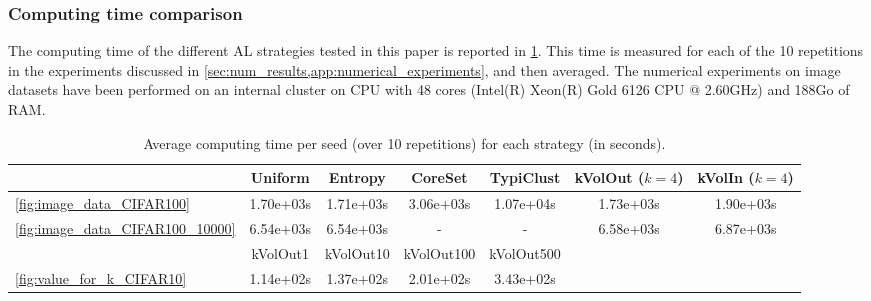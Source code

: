 \documentclass[twoside]{article}
\DeclareMathOperator{\kvol}{kVol}
\theoremstyle{definition}
\theoremstyle{remark}
\newcommand{\Dpool}{\mathcal{D}^{\mathrm{pool}}}
\begin{document}
\subsubsection{Computing time comparison}
\label{app:computing_time_comparison}

The computing time of the different AL strategies tested in this paper is reported in \cref{tab:computing_time_comparison}.
This time is measured for each of the 10 repetitions in the experiments discussed in \cref{sec:num_results,app:numerical_experiments}, and then averaged.
The numerical experiments on image datasets have been performed on an internal cluster on CPU with 48 cores (Intel(R) Xeon(R) Gold 6126 CPU @ 2.60GHz) and 188Go of RAM.

\begin{table}[ht]
    \centering
    \caption{Average computing time per seed (over 10 repetitions) for each strategy (in seconds).}
    \label{tab:computing_time_comparison}
    \begin{tabular}{lcccccc}
    \toprule
          & Uniform & Entropy & CoreSet & TypiClust & kVolOut ($k=4$) & kVolIn ($k=4$) \\
    \midrule
         \cref{fig:image_data_CIFAR100} & 1.70e+03s & 1.71e+03s & 3.06e+03s & 1.07e+04s & 1.73e+03s & 1.90e+03s \\
         \cref{fig:image_data_CIFAR100_10000} & 6.54e+03s & 6.54e+03s & - & - & 6.58e+03s & 6.87e+03s \\
    \bottomrule
    \toprule
        & kVolOut1 & kVolOut10 & kVolOut100 & kVolOut500 & & \\
    \midrule
        \cref{fig:value_for_k_CIFAR10} & 1.14e+02s & 1.37e+02s & 2.01e+02s & 3.43e+02s & & \\
    \bottomrule
    \end{tabular}
\end{table}

\end{document}
